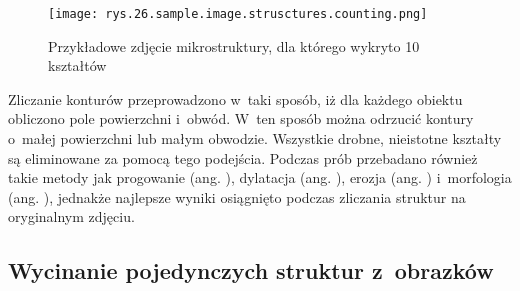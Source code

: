 \begin{figure}[h]
    \centering
    \texttt{[image: rys.26.sample.image.strusctures.counting.png]}
    \caption{Przykładowe zdjęcie mikrostruktury, dla którego wykryto 10 kształtów}
    \label{fig:mesh25}
\end{figure}
Zliczanie konturów przeprowadzono w~taki sposób, iż dla każdego obiektu obliczono pole powierzchni i~obwód. W~ten sposób można odrzucić kontury o~małej powierzchni lub małym obwodzie. Wszystkie drobne, nieistotne kształty są eliminowane za pomocą tego podejścia. Podczas prób przebadano również takie metody jak progowanie (ang. ), dylatacja (ang. ), erozja (ang. ) i~morfologia (ang. ), jednakże najlepsze wyniki osiągnięto podczas zliczania struktur na oryginalnym zdjęciu.

\subsection{Wycinanie pojedynczych struktur z~obrazków}
\label{wycinanie.struktur}

